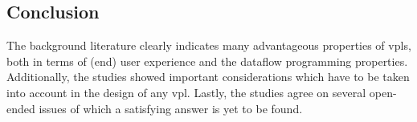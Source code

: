 \subsection{Conclusion}

The background literature clearly indicates many advantageous properties of vpls, both in terms of (end) user experience and the dataflow programming properties. 
Additionally, the studies showed important considerations which have to be taken into account in the design of any vpl.  
Lastly, the studies agree on several open-ended issues of which a satisfying answer is yet to be found. 

